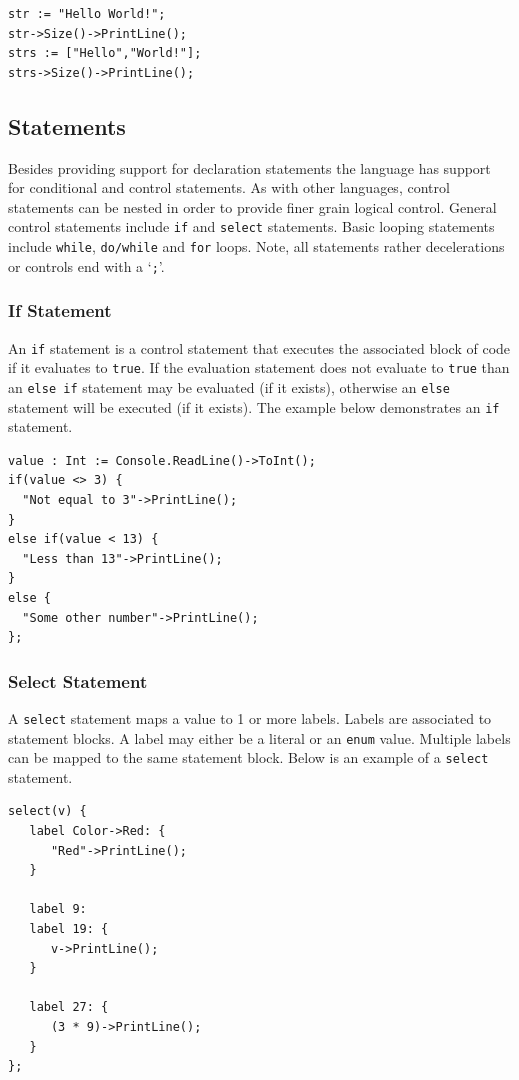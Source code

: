 \documentclass[12pt]{article}
\begin{document}
\begin{verbatim}
str := "Hello World!";
str->Size()->PrintLine();
strs := ["Hello","World!"];
strs->Size()->PrintLine();
\end{verbatim}

\subsection{Statements}
Besides providing support for declaration statements the language has support for conditional and control statements.  As with other languages, control statements can be nested in order to provide finer grain logical control. General control statements include \texttt{if} and \texttt{select} statements. Basic looping statements include \texttt{while}, \texttt{do/while} and \texttt{for} loops.  Note, all statements rather decelerations or controls end with a `\texttt{;}'.

\subsubsection{If Statement}

An \texttt{if} statement is a control statement that executes the associated block of code if it evaluates to \texttt{true}.  If the evaluation statement does not evaluate to \texttt{true} than an \texttt{else if} statement may be evaluated (if it exists), otherwise an \texttt{else} statement will be executed (if it exists).  The example below demonstrates an \texttt{if} statement.

\begin{verbatim}
value : Int := Console.ReadLine()->ToInt();
if(value <> 3) {
  "Not equal to 3"->PrintLine();
}
else if(value < 13) {
  "Less than 13"->PrintLine();
}
else {
  "Some other number"->PrintLine();
};
\end{verbatim}

\subsubsection{Select Statement}

A \texttt{select} statement maps a value to 1 or more labels.  Labels are associated to statement blocks.  A label may either be a literal or an \texttt{enum} value.  Multiple labels can be mapped to the same statement block.  Below is an example of a \texttt{select} statement.

\begin{verbatim}
select(v) {
   label Color->Red: {
      "Red"->PrintLine();
   }

   label 9:
   label 19: {
      v->PrintLine();
   }

   label 27: {
      (3 * 9)->PrintLine();
   }
};
\end{verbatim}
\end{document}
